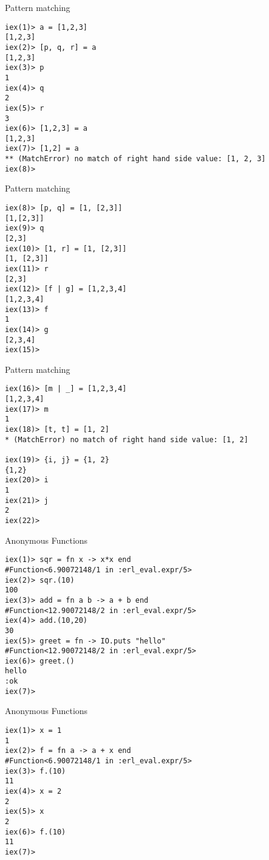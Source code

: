 \documentclass{beamer}
\begin{document}
\begin{frame}[fragile]{Pattern matching}

\begin{verbatim}
iex(1)> a = [1,2,3]
[1,2,3]
iex(2)> [p, q, r] = a
[1,2,3]
iex(3)> p
1
iex(4)> q
2
iex(5)> r
3
iex(6)> [1,2,3] = a
[1,2,3]
iex(7)> [1,2] = a
** (MatchError) no match of right hand side value: [1, 2, 3]
iex(8)> 
\end{verbatim}

\end{frame}
\begin{frame}[fragile]{Pattern matching}

\begin{verbatim}
iex(8)> [p, q] = [1, [2,3]]
[1,[2,3]]
iex(9)> q
[2,3]
iex(10)> [1, r] = [1, [2,3]]
[1, [2,3]]
iex(11)> r
[2,3]
iex(12)> [f | g] = [1,2,3,4]
[1,2,3,4]
iex(13)> f
1
iex(14)> g
[2,3,4]
iex(15)>

\end{verbatim}
\end{frame}
\begin{frame}[fragile]{Pattern matching}

\begin{verbatim}
iex(16)> [m | _] = [1,2,3,4]
[1,2,3,4]
iex(17)> m
1
iex(18)> [t, t] = [1, 2]
* (MatchError) no match of right hand side value: [1, 2]

iex(19)> {i, j} = {1, 2}
{1,2}
iex(20)> i
1
iex(21)> j
2
iex(22)> 
\end{verbatim}

\end{frame}

\begin{frame}[fragile]{Anonymous Functions}

\begin{verbatim}
iex(1)> sqr = fn x -> x*x end
#Function<6.90072148/1 in :erl_eval.expr/5>
iex(2)> sqr.(10)
100
iex(3)> add = fn a b -> a + b end
#Function<12.90072148/2 in :erl_eval.expr/5>
iex(4)> add.(10,20)
30
iex(5)> greet = fn -> IO.puts "hello"
#Function<12.90072148/2 in :erl_eval.expr/5>
iex(6)> greet.()
hello
:ok
iex(7)> 
\end{verbatim}
\end{frame}
\begin{frame}[fragile]{Anonymous Functions}

\begin{verbatim}
iex(1)> x = 1
1
iex(2)> f = fn a -> a + x end
#Function<6.90072148/1 in :erl_eval.expr/5>
iex(3)> f.(10)
11
iex(4)> x = 2
2
iex(5)> x
2
iex(6)> f.(10)
11
iex(7)>
\end{verbatim}

\end{frame}
\end{document}
